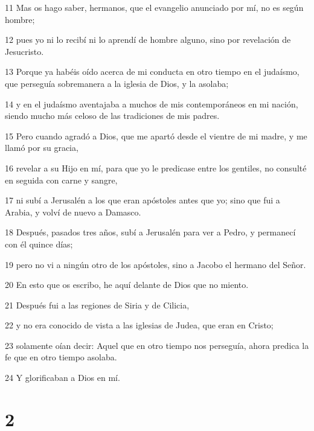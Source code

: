 \par 11 Mas os hago saber, hermanos, que el evangelio anunciado por mí, no es según hombre;
\par 12 pues yo ni lo recibí ni lo aprendí de hombre alguno, sino por revelación de Jesucristo.
\par 13 Porque ya habéis oído acerca de mi conducta en otro tiempo en el judaísmo, que perseguía sobremanera a la iglesia de Dios, y la asolaba;
\par 14 y en el judaísmo aventajaba a muchos de mis contemporáneos en mi nación, siendo mucho más celoso de las tradiciones de mis padres.
\par 15 Pero cuando agradó a Dios, que me apartó desde el vientre de mi madre, y me llamó por su gracia,
\par 16 revelar a su Hijo en mí, para que yo le predicase entre los gentiles, no consulté en seguida con carne y sangre,
\par 17 ni subí a Jerusalén a los que eran apóstoles antes que yo; sino que fui a Arabia, y volví de nuevo a Damasco.
\par 18 Después, pasados tres años, subí a Jerusalén para ver a Pedro, y permanecí con él quince días;
\par 19 pero no vi a ningún otro de los apóstoles, sino a Jacobo el hermano del Señor.
\par 20 En esto que os escribo, he aquí delante de Dios que no miento.
\par 21 Después fui a las regiones de Siria y de Cilicia,
\par 22 y no era conocido de vista a las iglesias de Judea, que eran en Cristo;
\par 23 solamente oían decir: Aquel que en otro tiempo nos perseguía, ahora predica la fe que en otro tiempo asolaba.
\par 24 Y glorificaban a Dios en mí.

\chapter{2}

